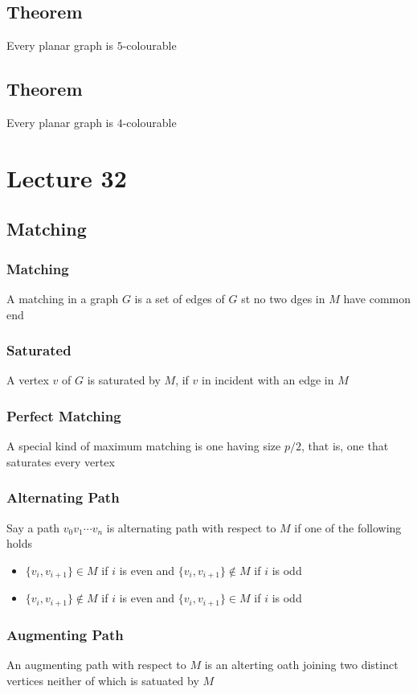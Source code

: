 \documentclass[11pt]{article}
\begin{document}
\subsection*{Theorem}
Every planar graph is $5$-colourable
\subsection*{Theorem}
Every planar graph is $4$-colourable


\section{Lecture 32}
\subsection{Matching}
\subsubsection*{Matching}
A matching in a graph $G$ is a set of edges of $G$ st no two dges in $M$ have common end 
\subsubsection*{Saturated}
A vertex $v$ of $G$ is saturated by $M$, if $v$ in incident with an edge in $M$
\subsubsection*{Perfect Matching}
A special kind of maximum matching is one having size $p/2$, that is, one that saturates every vertex 
\subsubsection*{Alternating Path}
Say a path $v_0v_1\cdots v_n$ is alternating path with respect to $M$ if one of the following holds
\begin{itemize}
  \item $\{v_i,v_{i+1}\}\in M$ if $i$ is even and $\{v_i,v_{i+1}\}\notin M$ if $i$ is odd 
  \item $\{v_i,v_{i+1}\}\notin M$ if $i$ is even and $\{v_i,v_{i+1}\}\in M$ if $i$ is odd 
\end{itemize} 
\subsubsection*{Augmenting Path}
An augmenting path with respect to $M$ is an alterting oath joining two distinct vertices neither of which is satuated by $M$
\end{document}
